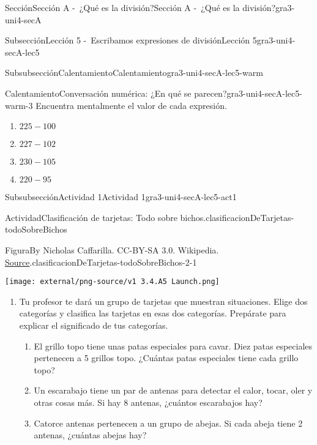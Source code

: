 \documentclass[twoside,10pt,]{article}
\begin{document}
\begin{sectionptx}{Sección}{Sección A -~¿Qué es la división?}{}{Sección A -~¿Qué es la división?}{}{}{gra3-uni4-secA}
\begin{subsectionptx}{Subsección}{Lección 5 -~Escribamos expresiones de división}{}{Lección 5}{}{}{gra3-uni4-secA-lec5}
\begin{subsubsectionptx}{Subsubsección}{Calentamiento}{}{Calentamiento}{}{}{gra3-uni4-secA-lec5-warm}
\begin{exploration}{Calentamiento}{Conversación numérica: ¿En qué se parecen?}{gra3-uni4-secA-lec5-warm-3}%
Encuentra mentalmente el valor de cada expresión.%
\par
%
\begin{enumerate}
\item{}\(\displaystyle 225 - 100\)%
\item{}\(\displaystyle 227 - 102\)%
\item{}\(\displaystyle 230 - 105\)%
\item{}\(\displaystyle 220 - 95\)%
\end{enumerate}
%
\end{exploration}%
\end{subsubsectionptx}
%
%
\typeout{************************************************}
\typeout{************************************************}
%
\begin{subsubsectionptx}{Subsubsección}{Actividad 1}{}{Actividad 1}{}{}{gra3-uni4-secA-lec5-act1}
\begin{activity}{Actividad}{Clasificación de tarjetas: Todo sobre bichos.}{clasificacionDeTarjetas-todoSobreBichos}%
\begin{figureptx}{Figura}{By Nicholas Caffarilla. CC-BY-SA 3.0. Wikipedia. \href{https://en.wikipedia.org/wiki/Insect\#/media/File:Insect_collage.png}{Source}\protect\footnotemark{}.}{clasificacionDeTarjetas-todoSobreBichos-2-1}{}%
\begin{image}{0.25}{0.5}{0.25}{}%
\texttt{[image: external/png-source/v1 3.4.A5 Launch.png]}
\end{image}%
\tcblower
\end{figureptx}%
%
\begin{enumerate}
\item{}Tu profesor te dará un grupo de tarjetas que muestran situaciones. Elige dos categorías y clasifica las tarjetas en esas dos categorías. Prepárate para explicar el significado de tus categorías.%
%
\begin{enumerate}[label=(\Alph*)]
\item{}El grillo topo tiene unas patas especiales para cavar. Diez patas especiales pertenecen a 5 grillos topo. ¿Cuántas patas especiales tiene cada grillo topo?%
\item{}Un escarabajo tiene un par de antenas para detectar el calor, tocar, oler y otras cosas más. Si hay 8 antenas, ¿cuántos escarabajos hay?%
\item{}Catorce antenas pertenecen a un grupo de abejas. Si cada abeja tiene 2 antenas, ¿cuántas abejas hay?%

\end{enumerate}
\end{enumerate}
\end{activity}
\end{subsubsectionptx}
\end{subsectionptx}
\end{sectionptx}
\end{document}
